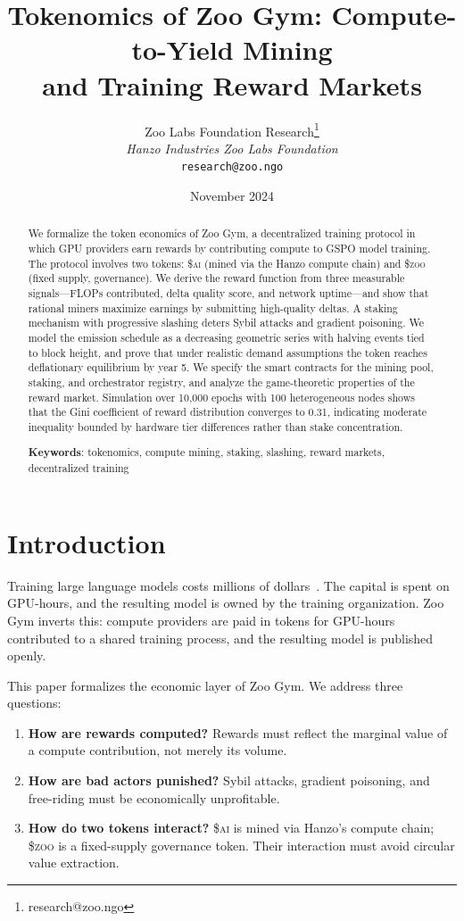 \documentclass[11pt,letterpaper]{article}
\title{\textbf{Tokenomics of Zoo Gym: Compute-to-Yield Mining\\and Training Reward Markets}}
\author{
Zoo Labs Foundation Research\thanks{research@zoo.ngo}\\
\textit{Hanzo Industries \quad Zoo Labs Foundation}\\
\texttt{research@zoo.ngo}
}
\date{November 2024}
\newcommand{\AI}{\$\textsc{ai}}
\newcommand{\ZOO}{\$\textsc{zoo}}
\begin{document}
\zoocoverpage

\begin{abstract}
We formalize the token economics of Zoo Gym, a decentralized training protocol in which GPU providers earn rewards by contributing compute to GSPO model training.  The protocol involves two tokens: \AI{} (mined via the Hanzo compute chain) and \ZOO{} (fixed supply, governance).  We derive the reward function from three measurable signals---FLOPs contributed, delta quality score, and network uptime---and show that rational miners maximize earnings by submitting high-quality deltas.  A staking mechanism with progressive slashing deters Sybil attacks and gradient poisoning.  We model the emission schedule as a decreasing geometric series with halving events tied to block height, and prove that under realistic demand assumptions the token reaches deflationary equilibrium by year 5.  We specify the smart contracts for the mining pool, staking, and orchestrator registry, and analyze the game-theoretic properties of the reward market.  Simulation over 10{,}000 epochs with 100 heterogeneous nodes shows that the Gini coefficient of reward distribution converges to 0.31, indicating moderate inequality bounded by hardware tier differences rather than stake concentration.

\textbf{Keywords}: tokenomics, compute mining, staking, slashing, reward markets, decentralized training
\end{abstract}

\section{Introduction}

Training large language models costs millions of dollars~\cite{brown2020gpt3}.  The capital is spent on GPU-hours, and the resulting model is owned by the training organization.  Zoo Gym inverts this: compute providers are paid in tokens for GPU-hours contributed to a shared training process, and the resulting model is published openly.

This paper formalizes the economic layer of Zoo Gym.  We address three questions:

\begin{enumerate}
    \item \textbf{How are rewards computed?}  Rewards must reflect the marginal value of a compute contribution, not merely its volume.
    \item \textbf{How are bad actors punished?}  Sybil attacks, gradient poisoning, and free-riding must be economically unprofitable.
    \item \textbf{How do two tokens interact?}  \AI{} is mined via Hanzo's compute chain; \ZOO{} is a fixed-supply governance token.  Their interaction must avoid circular value extraction.
\end{enumerate}
\end{document}
